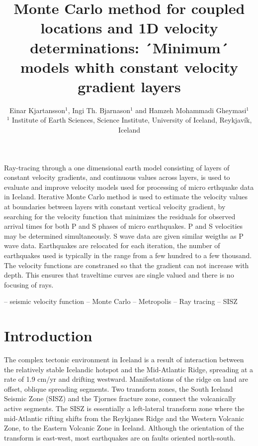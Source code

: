\documentclass[extra]{gji}
\title[Monte Carlo method for 1D velocity determination]
  {Monte Carlo method for coupled locations and 1D velocity
  determinations: ´Minimum´ models whith constant velocity 
  gradient layers
   }
\author[E. Kjartansson, I.Th. Bjarnason and H.M. Gheymasi] 
{Einar Kjartansson$^1$, Ingi Th. Bjarnason$^1$ and Hamzeh Mohammadi Gheymasi$^1$\\
$^1$ Institute of Earth Sciences, Science Institute, University of Iceland, Reykjavík, Iceland }
\begin{document}
\label{firstpage}

\maketitle


\begin{summary}
Ray-tracing through a one dimensional earth model consisting of layers of constant
velocity gradients, and continuous values across layers, is used to evaluate and improve
velocity models used for processing of micro erthquake data in Iceland.
Iterative Monte Carlo method is used to estimate the velocity values at boundaries between
layers with constant vertical velocity gradient, by searching for the velocity function that 
minimizes the residuals for observed arrival times for both P and S phases of micro earthquakes.
P and S velocities may be determined simultaneously.
S wave data are given similar weigths as P wave data.
Earthquakes are relocated for each iteration, the number of earthquakes used is typically in the
range from a few hundred to a few thousand.
The velocity functions are constraned so that the gradient can not increase with depth. This
ensures that traveltime curves are single valued and there is no focusing of rays.
\end{summary}

\begin{keywords}
-- seismic velocity function -- Monte Carlo -- Metropolis -- Ray tracing 
-- SISZ 
\end{keywords}

\section{Introduction}

The complex tectonic environment in Iceland is
a result of interaction between the relatively stable Icelandic hotspot
and the Mid-Atlantic Ridge, spreading at a rate of 1.9 cm/yr and 
drifting westward.
Manifestations of the ridge on land
are offset, oblique spreading segments. Two transform zones, 
the South Iceland Seismic Zone
(SISZ) and the Tjornes fracture zone, connect
the volcanically active segments.
The SISZ is essentially a left-lateral transform zone where the mid-Atlantic
rifting shifts from the Reykjanes Ridge and the Western Volcanic Zone, to
the Eastern Volcanic Zone in Iceland. Although the orientation of the
transform is east-west, most earthquakes are on faults oriented
north-south.
\end{document}
